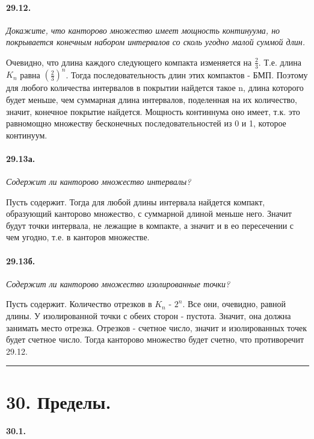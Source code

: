 \documentclass{book}
\begin{document}
\paragraph{29.12.}
\textit{Докажите, что канторово множество имеет мощность континуума, но покрывается конечным набором интервалов со сколь угодно малой суммой длин.}

Очевидно, что длина каждого следующего компакта изменяется на $\frac{2}{3}$. Т.е. длина $K_n$ равна $(\frac{2}{3})^n$. Тогда последовательность длин этих компактов - БМП. Поэтому для любого количества интервалов в покрытии найдется такое n, длина которого будет меньше, чем суммарная длина интервалов, поделенная на их количество, значит, конечное покрытие найдется. Мощность континнума оно имеет, т.к. это равномощно множеству бесконечных последовательностей из 0 и 1, которое континуум.

\paragraph{29.13а.}
\textit{Содержит ли канторово множество интервалы?}

Пусть содержит. Тогда для любой длины интервала найдется компакт, образующий канторово множество, с суммарной длиной меньше него. Значит будут точки интервала, не лежащие в компакте, а значит и в ео пересечении с чем угодно, т.е. в канторов множестве.

\paragraph{29.13б.}
\textit{Содержит ли канторово множество изолированные точки?}

Пусть содержит. Количество отрезков в $K_n$ - $2^n$. Все они, очевидно, равной длины. У изолированной точки с обеих сторон - пустота. Значит, она должна занимать место отрезка. Отрезков - счетное число, значит и изолированных точек будет счетное число. Тогда канторово множество будет счетно, что противоречит 29.12.

\medskip \hrule \medskip

\section*{30. Пределы.}

\paragraph{30.1.}
\end{document}
